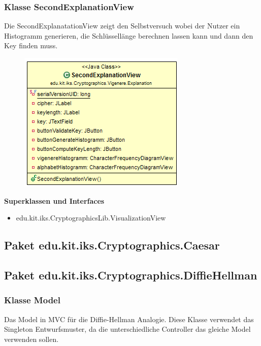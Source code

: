 \documentclass{article}
\begin{document}
    \subsubsection{Klasse SecondExplanationView}
      Die SecondExplanatationView zeigt den Selbstversuch wobei der Nutzer ein Histogramm generieren, die Schlüssellänge berechnen lassen kann und dann den Key finden muss.
      \begin{figure}[H]
        \centering
        \includegraphics{resources/edu-kit-iks-Cryptographics-Vigenere-SecondExplanationView}
      \end{figure}

      \textbf{Superklassen und Interfaces}
      \begin{itemize}
        \item edu.kit.iks.CryptographicsLib.VisualizationView
      \end{itemize}

\subsection{Paket edu.kit.iks.Cryptographics.Caesar}

\subsection{Paket edu.kit.iks.Cryptographics.DiffieHellman}
\subsubsection{Klasse Model}
      Das Model in MVC für die Diffie-Hellman Analogie.
      Diese Klasse verwendet das Singleton Entwurfsmuster,
      da die unterschiedliche Controller das gleiche Model verwenden sollen.
\end{document}
